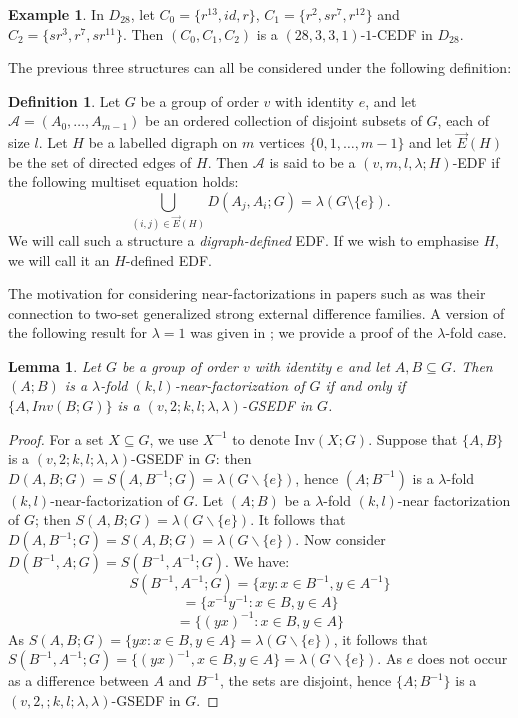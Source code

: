 \documentclass[12pt, a4paper]{article}
\newtheorem{lemma}[theorem]{Lemma}
\theoremstyle{definition}
\newtheorem{example}[theorem]{Example}
\newtheorem{definition}[theorem]{Definition}
\newcommand{\E}{\overrightarrow{E}}
\begin{document}
\begin{example}
In $D_{28}$, let $C_0=\{r^{13},id,r\}$, $C_1=\{r^2,sr^7,r^{12}\}$ and $C_2=\{sr^3,r^7,sr^{11}\}$.  Then $(C_0,C_1,C_2)$ is a $(28,3,3,1)$-$1$-CEDF in $D_{28}$.
\end{example}

The previous three structures can all be considered under the following definition:
\begin{definition}\label{def:H-defined EDF}
Let $G$ be a group of order $v$ with identity $e$, and let $\mathcal{A}=(A_0,\ldots,A_{m-1})$ be an ordered collection of disjoint subsets of $G$, each of size $l$.  Let $H$ be a labelled digraph on $m$ vertices $\{0,1,\ldots,m-1\}$ and let $\E(H)$ be the set of directed edges of $H$.  Then $\mathcal{A}$ is said to be a $(v,m,l,\lambda; H)$-EDF if the following multiset equation holds:
$$ \bigcup_{(i,j) \in \E(H)} D(A_j,A_i;G) = \lambda (G \setminus \{e\}).$$
We will call such a structure a \emph{digraph-defined} EDF.  If we wish to emphasise $H$, we will call it an $H$-defined EDF.
\end{definition}


The motivation for considering near-factorizations in papers such as \cite{KrePatSti} was their connection to two-set generalized strong external difference families. A version of the following result for $\lambda=1$ was given in \cite{KrePatSti}; we provide a proof of the $\lambda$-fold case.

\begin{lemma}\label{NearSEDF}
Let $G$ be a group of order $v$ with identity $e$ and let $A,B \subseteq G$. Then $(A;B)$ is a $\lambda$-fold $(k,l)$-near-factorization of $G$ if and only if $\{A,Inv(B;G)\}$ is a $(v,2;k,l;\lambda,\lambda)$-GSEDF in $G$.
\end{lemma}
\begin{proof}
For a set $X \subseteq G$, we use $X^{-1}$ to denote $\mathrm{Inv}(X;G)$.
Suppose that $\{A,B\}$ is a $(v,2;k,l;\lambda,\lambda)$-GSEDF in $G$: then $D(A,B;G)=S(A,B^{-1};G)=\lambda(G\backslash\{e\})$, hence $(A;B^{-1})$ is a $\lambda$-fold $(k,l)$-near-factorization of $G$.
    Let $(A;B)$ be a $\lambda$-fold $(k,l)$-near factorization of $G$; then $S(A,B;G)=\lambda(G\backslash\{e\})$. It follows that $D(A,B^{-1};G)=S(A,B;G)=\lambda(G\backslash\{e\})$. Now consider $D(B^{-1},A;G) = S(B^{-1},A^{-1};G)$.  We have:
    \[S(B^{-1},A^{-1};G)=\{xy:x \in B^{-1},y \in A^{-1}\}\]
    \[=\{x^{-1}y^{-1}:x \in B,y \in A\}\]
    \[=\{(yx)^{-1}:x \in B,y \in A\}\]
    As $S(A,B;G)=\{yx:x \in B,y \in A\}=\lambda(G\backslash\{e\})$, it follows that $S(B^{-1},A^{-1};G)=\{(yx)^{-1},x \in B,y \in A\}=\lambda(G\backslash\{e\})$. As $e$ does not occur as a difference between $A$ and $B^{-1}$, the sets are disjoint, hence $\{A;B^{-1}\}$ is a $(v,2,;k,l;\lambda,\lambda)$-GSEDF in $G$.
\end{proof}
\end{document}
